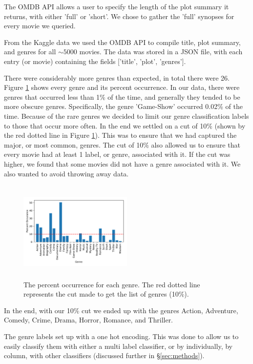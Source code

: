 \documentclass[11pt]{article}
\begin{document}
The OMDB API allows a user to specify the length of the plot summary it returns, with either 'full' or 'short'. We chose to gather the 'full' synopses for every movie we queried.

From the Kaggle data we used the OMDB API to compile title, plot summary, and genres for all $\sim5000$ movies. The data was stored in a JSON file, with each entry (or movie) containing the fields ['title', 'plot', 'genres'].

There were considerably more genres than expected, in total there were 26. Figure \ref{fig:genres} shows every genre and its percent occurrence. In our data, there were genres that occurred less than 1\% of the time, and generally they tended to be more obscure genres. Specifically, the genre 'Game-Show' occurred 0.02\% of the time. Because of the rare genres we decided to limit our genre classification labels to those that occur more often. In the end we settled on a cut of 10\% (shown by the red dotted line in Figure \ref{fig:genres}). This was to ensure that we had captured the major, or most common, genres. The cut of 10\% also allowed us to ensure that every movie had at least 1 label, or genre, associated with it. If the cut was higher, we found that some movies did not have a genre associated with it. We also wanted to avoid throwing away data. 

\begin{figure}[ht]
	\centering
		\includegraphics[width=0.5\textwidth,height=5cm]{genres.pdf}
	\caption{The percent occurrence for each genre. The red dotted line represents the cut made to get the list of genres (10\%).}
	\label{fig:genres}
\end{figure}

In the end, with our 10\% cut we ended up with the genres Action, Adventure, Comedy, Crime, Drama, Horror, Romance, and Thriller.

The genre labels set up with a one hot encoding. This was done to allow us to easily classify them with either a multi label classifier, or by individually, by column, with other classifiers (discussed further in \S \ref{sec:methods}). 
\end{document}
